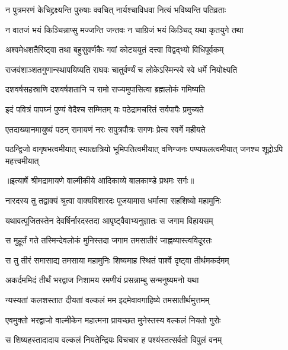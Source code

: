\twolineshloka
{न पुत्रमरणं केचिद्द्रक्ष्यन्ति पुरुषाः क्वचित्}
{नार्यश्चाविधवा नित्यं भविष्यन्ति पतिव्रताः} %

\twolineshloka
{न वातजं भयं किञ्चिन्नाप्सु मज्जन्ति जन्तवः}
{न चाग्रिजं भयं किञ्चिद् यथा कृतयुगे तथा} %

\twolineshloka
{अश्वमेधशतैरिष्ट्वा तथा बहुसुवर्णकैः}
{गवां कोट्ययुतं दत्त्वा विद्वद्भ्यो विधिपूर्वकम्} %

\twolineshloka
{राजवंशाञ्शतगुणान्स्थापयिष्यति राघवः}
{चातुर्वर्ण्यं च लोकेऽस्मिन्स्वे स्वे धर्मे नियोक्ष्यति} %

\twolineshloka
{दशवर्षसहस्राणि दशवर्षशतानि च}
{रामो राज्यमुपासित्वा ब्रह्मलोकं गमिष्यति} %

\twolineshloka
{इदं पवित्रं पापघ्नं पुण्यं वेदैश्च सम्मितम्}
{यः पठेद्रामचरितं सर्वपापैः प्रमुच्यते} %

\twolineshloka
{एतदाख्यानमायुष्यं पठन् रामायणं नरः}
{सपुत्रपौत्रः सगणः प्रेत्य स्वर्गे महीयते} %

\fourlineindentedshloka
{पठन्द्विजो वागृषभत्वमीयात्}
{स्यात्क्षत्रियो भूमिपतित्वमीयात्}
{वणिग्जनः पण्यफलत्वमीयात्}
{जनश्च शूद्रोऽपि महत्त्वमीयात्} %


{॥इत्यार्षे श्रीमद्रामायणे वाल्मीकीये आदिकाव्ये बालकाण्डे प्रथमः सर्गः॥}


\twolineshloka
{नारदस्य तु तद्वाक्यं श्रुत्वा वाक्यविशारदः}
{पूजयामास धर्मात्मा सहशिष्यो महामुनिः} %

\twolineshloka
{यथावत्पूजितस्तेन देवर्षिर्नारदस्तदा}
{आपृष्ट्वैवाभ्यनुज्ञातः स जगाम विहायसम्} %

\twolineshloka
{स मुहूर्तं गते तस्मिन्देवलोकं मुनिस्तदा}
{जगाम तमसातीरं जाह्नव्यास्त्वविदूरतः} %

\twolineshloka
{स तु तीरं समासाद्य तमसाया महामुनिः}
{शिष्यमाह स्थितं पार्श्वे दृष्ट्वा तीर्थमकर्दमम्} %

\twolineshloka
{अकर्दममिदं तीर्थं भरद्वाज निशामय}
{रमणीयं प्रसन्नाम्बु सन्मनुष्यमनो यथा} %

\twolineshloka
{न्यस्यतां कलशस्तात दीयतां वल्कलं मम}
{इदमेवावगाहिष्ये तमसातीर्थमुत्तमम्} %

\twolineshloka
{एवमुक्तो भरद्वाजो वाल्मीकेन महात्मना}
{प्रायच्छत मुनेस्तस्य वल्कलं नियतो गुरोः} %

\twolineshloka
{स शिष्यहस्तादादाय वल्कलं नियतेन्द्रियः}
{विचचार ह पश्यंस्तत्सर्वतो विपुलं वनम्} %

